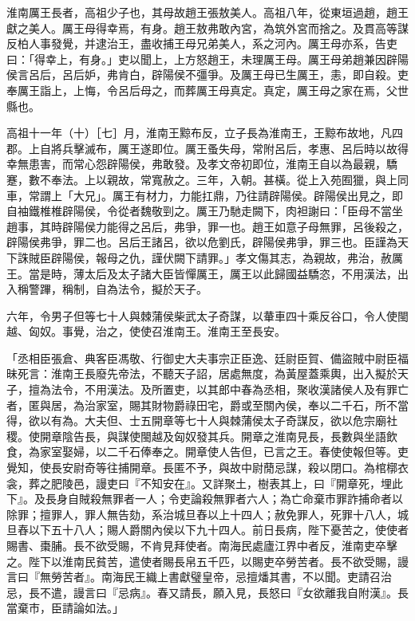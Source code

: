 
\begin{pinyinscope}
淮南厲王長者，高祖少子也，其母故趙王張敖美人。高祖八年，從東垣過趙，趙王獻之美人。厲王母得幸焉，有身。趙王敖弗敢內宮，為筑外宮而捨之。及貫高等謀反柏人事發覺，并逮治王，盡收捕王母兄弟美人，系之河內。厲王母亦系，告吏曰：「得幸上，有身。」吏以聞上，上方怒趙王，未理厲王母。厲王母弟趙兼因辟陽侯言呂后，呂后妒，弗肯白，辟陽侯不彊爭。及厲王母已生厲王，恚，即自殺。吏奉厲王詣上，上悔，令呂后母之，而葬厲王母真定。真定，厲王母之家在焉，父世縣也。

高祖十一年（十）［七］月，淮南王黥布反，立子長為淮南王，王黥布故地，凡四郡。上自將兵擊滅布，厲王遂即位。厲王蚤失母，常附呂后，孝惠、呂后時以故得幸無患害，而常心怨辟陽侯，弗敢發。及孝文帝初即位，淮南王自以為最親，驕蹇，數不奉法。上以親故，常寬赦之。三年，入朝。甚橫。從上入苑囿獵，與上同車，常謂上「大兄」。厲王有材力，力能扛鼎，乃往請辟陽侯。辟陽侯出見之，即自袖鐵椎椎辟陽侯，令從者魏敬剄之。厲王乃馳走闕下，肉袒謝曰：「臣母不當坐趙事，其時辟陽侯力能得之呂后，弗爭，罪一也。趙王如意子母無罪，呂後殺之，辟陽侯弗爭，罪二也。呂后王諸呂，欲以危劉氏，辟陽侯弗爭，罪三也。臣謹為天下誅賊臣辟陽侯，報母之仇，謹伏闕下請罪。」孝文傷其志，為親故，弗治，赦厲王。當是時，薄太后及太子諸大臣皆憚厲王，厲王以此歸國益驕恣，不用漢法，出入稱警蹕，稱制，自為法令，擬於天子。

六年，令男子但等七十人與棘蒲侯柴武太子奇謀，以輂車四十乘反谷口，令人使閩越、匈奴。事覺，治之，使使召淮南王。淮南王至長安。

「丞相臣張倉、典客臣馮敬、行御史大夫事宗正臣逸、廷尉臣賀、備盜賊中尉臣福昧死言：淮南王長廢先帝法，不聽天子詔，居處無度，為黃屋蓋乘輿，出入擬於天子，擅為法令，不用漢法。及所置吏，以其郎中春為丞相，聚收漢諸侯人及有罪亡者，匿與居，為治家室，賜其財物爵祿田宅，爵或至關內侯，奉以二千石，所不當得，欲以有為。大夫但、士五開章等七十人與棘蒲侯太子奇謀反，欲以危宗廟社稷。使開章陰告長，與謀使閩越及匈奴發其兵。開章之淮南見長，長數與坐語飲食，為家室娶婦，以二千石俸奉之。開章使人告但，已言之王。春使使報但等。吏覺知，使長安尉奇等往捕開章。長匿不予，與故中尉蕑忌謀，殺以閉口。為棺槨衣衾，葬之肥陵邑，謾吏曰『不知安在』。又詳聚土，樹表其上，曰『開章死，埋此下』。及長身自賊殺無罪者一人；令吏論殺無罪者六人；為亡命棄市罪詐捕命者以除罪；擅罪人，罪人無告劾，系治城旦舂以上十四人；赦免罪人，死罪十八人，城旦舂以下五十八人；賜人爵關內侯以下九十四人。前日長病，陛下憂苦之，使使者賜書、棗脯。長不欲受賜，不肯見拜使者。南海民處廬江界中者反，淮南吏卒擊之。陛下以淮南民貧苦，遣使者賜長帛五千匹，以賜吏卒勞苦者。長不欲受賜，謾言曰『無勞苦者』。南海民王織上書獻璧皇帝，忌擅燔其書，不以聞。吏請召治忌，長不遣，謾言曰『忌病』。春又請長，願入見，長怒曰『女欲離我自附漢』。長當棄市，臣請論如法。」


\end{pinyinscope}
